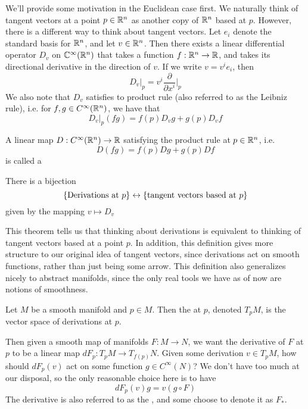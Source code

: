 We'll provide some motivation in the Euclidean case first. We naturally
think of tangent vectors at a point $p \in \mathbb{R}^n$ as another copy of $\mathbb{R}^n$
based at $p$. However, there is a different way to think about tangent
vectors. Let $e_i$ denote the standard basis for $\mathbb{R}^n$, and let $v \in
\mathbb{R}^n$. Then there exists a linear differential operator $D_v$ on
$\mathbb{C}^\infty(\mathbb{R}^n)$ that takes a function $f: \mathbb{R}^n \to \mathbb{R}$, and takes its
directional derivative in the direction of $v$. If we write $v = v^ie_i$,
then
$$D_v\vert_p = v^i\frac{\partial}{\partial x^i}\vert_p $$
We also note that $D_v$ satisfies to product rule (also referred to as
the Leibniz rule), i.e. for $f,g \in C^\infty(\mathbb{R}^n)$, we have that
$$D_v\vert_p(fg) = f(p)D_vg + g(p)D_vf$$
\begin{defn}
	A linear map $D : C^\infty(\mathbb{R}^n) \to \mathbb{R}$ satisfying the product rule at $p \in \mathbb{R}^n$,
	i.e.
	$$D(fg) = f(p)Dg + g(p)Df$$
	is called a 
\end{defn}
%
\begin{thm}
	There is a bijection
	$$\left\lbrace \text{Derivations at } p \right\rbrace \leftrightarrow
	\left\lbrace \text{tangent vectors based at } p \right\rbrace  $$
	given by the mapping $v \mapsto D_v$
\end{thm}
%
This theorem tells us that thinking about derivations is equivalent to thinking
of tangent vectors based at a point $p$. In addition, this definition gives
more structure to our original idea of tangent vectors, since derivations act
on smooth functions, rather than just being some arrow. This definition also
generalizes nicely to abstract manifolds, since the only real tools we have
as of now are notions of smoothness.
%
\begin{defn}
	Let $M$ be a smooth manifold and $p \in M$. Then the  at
	$p$, denoted $T_pM$, is the vector space of derivations at $p$.
\end{defn}
%
Then given a smooth map of manifolds $F: M \to N$, we want the derivative of $F$
at $p$ to be a linear map $dF_p : T_pM \to T_{f(p)}N$. Given some derivation
$v \in T_pM$, how should $dF_p(v)$ act on some function $g \in C^\infty(N)$?
We don't have too much at our disposal, so the only reasonable choice here is
to have
$$dF_p(v)g = v(g \circ F) $$
The derivative is also referred to as the , and some choose
to denote it as $F_*$.\\

